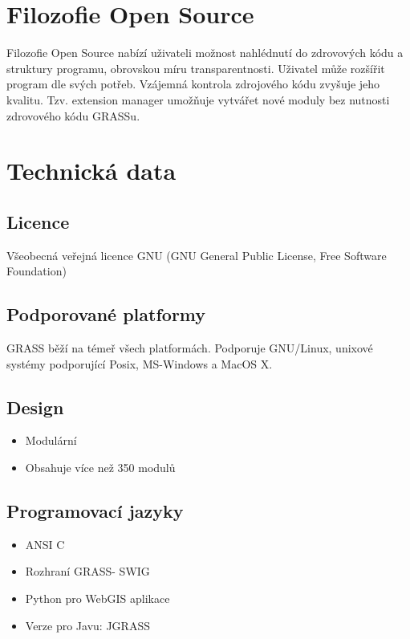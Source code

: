 \documentclass[notumble,a4paper,10pt,nofoldmark]{leaflet}
\begin{document}
\section{Filozofie Open Source}

Filozofie Open Source nabízí uživateli možnost nahlédnutí do zdrovových kódu a struktury programu, obrovskou míru transparentnosti. Uživatel může rozšířit program dle svých potřeb. Vzájemná kontrola zdrojového kódu zvyšuje jeho kvalitu. Tzv. extension manager umožňuje vytvářet nové moduly bez nutnosti zdrovového kódu GRASSu.

\section{Technická data}

\subsection{Licence}

Všeobecná veřejná licence GNU (GNU General Public License, Free Software Foundation)

\subsection{Podporované platformy}

GRASS běží na témeř všech platformách. Podporuje GNU/Linux, unixové systémy podporující Posix, MS-Windows a MacOS X.

\subsection{Design}

\begin{itemize}
\item Modulární
\item Obsahuje více než 350 modulů
\end{itemize}

\subsection{Programovací jazyky}

\begin{itemize}
\item ANSI C
\item Rozhraní GRASS- SWIG
\item Python pro WebGIS aplikace
\item Verze pro Javu: JGRASS
\end{itemize}
\end{document}

